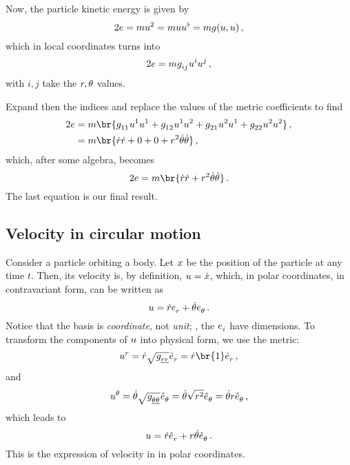 Now, the particle kinetic energy is given by
%
\begin{equation*}
  2\energy = \mass\vel^2
  = \mass\vel\fvec\vel
  = \mass\metric\vat{\vel,\vel}\,,
\end{equation*}
%
which in local coordinates turns into
%
\begin{equation*}
  2\energy = \mass\tmetric ij\tvec\vel i\tvec\vel j\,,
\end{equation*}
%
with $i,j$ take the $r,\theta$ values.

Expand then the indices and replace the values of the metric coefficients to find
%
\begin{align*}
  2\energy &= \mass\br{
    \tmetric 11\tvec\vel 1\tvec\vel 1
    + \tmetric 12\tvec\vel 1\tvec\vel 2
    + \tmetric 21\tvec\vel 2\tvec\vel 1
    + \tmetric 22\tvec\vel 2\tvec\vel 2
  } \,,\\
  &= \mass\br{\mdt\cxpos\mdt\cxpos + 0 + 0 + \cxpos^2\mdt\cypos\mdt\cypos}\,,
\end{align*}
%
which, after some algebra, becomes
%
\begin{equation*}
  2\energy = \mass\br{\mdt\cxpos\mdt\cxpos + \cxpos^2\mdt\cypos\mdt\cypos}\,.
\end{equation*}
%
The last equation is our final result.


\subsection{Velocity in circular motion}
\label{subsec:velocity-circular-motion}

Consider a particle orbiting a body. Let $x$ be the position of the particle at any time $t$. Then, its velocity is, by definition, $u = \dot{x}$, which, in polar coordinates, in contravariant form, can be written as
%
\begin{equation*}
  \vel = \mdt\cxpos\tbvec\cxpos + \mdt\cypos\tbvec\cypos\,.
\end{equation*}
%
Notice that the basis is \emph{coordinate}, not \emph{unit}; \ie, the $\tbvec i$ have dimensions. To transform the components of $u$ into physical form, we use the metric:
%
\begin{equation*}
  \tvec\vel\cxpos
  = \mdt\cxpos\sqrt{\pmetric\cxpos\cxpos}\pbvec\cxpos
  = \mdt\cxpos\br{1}\pbvec\cxpos \,,
\end{equation*}
%
and
%
\begin{equation*}
  \tvec\vel\cypos
  = \mdt\cypos\sqrt{\pmetric\cypos\cypos}\pbvec\cypos
  = \mdt\cypos\sqrt{\cxpos^2}\pbvec\cypos
  = \mdt\cypos\cxpos\pbvec\cypos \,,
\end{equation*}
%
which leads to
%
\begin{equation*}
  \vel = \mdt\cxpos\pbvec\cxpos + \cxpos\mdt\cypos\pbvec\cypos \,.
\end{equation*}
%
This is the expression of velocity in  in polar coordinates.
